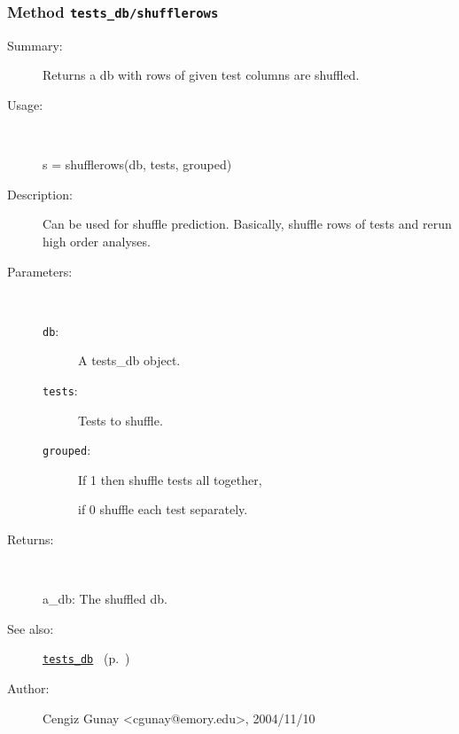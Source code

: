\subsubsection[Method \texttt{shufflerows}]{Method \texttt{tests\_db/shufflerows}}%
%
\label{ref_tests_db__shufflerows}%
\hypertarget{ref_tests_db__shufflerows}{}%
\begin{description}
\item[Summary:]Returns a db with rows of given test columns are shuffled. 
%
\item[Usage:]~%
\begin{lyxcode}%
s = shufflerows(db, tests, grouped)
%
\end{lyxcode}%
%
\item[Description:]%
Can be used for shuffle prediction. Basically, shuffle rows of tests and rerun
 high order analyses. 
\item[Parameters:]~
\begin{description}%
\item[\texttt{db}:]
 A tests\_db object.
\item[\texttt{tests}:]
 Tests to shuffle.
\item[\texttt{grouped}:]
 If 1 then shuffle tests all together, 

if 0 shuffle each test separately.\end{description}%
%
\item[Returns:]~

	a\_db: The shuffled db.
%
%
\item[See also:]%
\hyperlink{ref_tests_db}{\texttt{tests\_db}}%
\ (p.~\pageref{ref_tests_db})%
%
%
\item[Author:]%
Cengiz Gunay <cgunay@emory.edu>, 2004/11/10%
\end{description}
\methodline%
